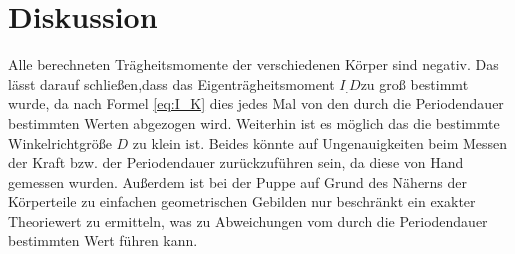 \section{Diskussion}
\label{sec:Diskussion}
Alle berechneten Trägheitsmomente der verschiedenen Körper sind negativ.
Das lässt darauf schließen,dass das Eigenträgheitsmoment $I_.D $zu groß bestimmt wurde, da nach Formel \eqref{eq:I_K} dies jedes Mal von den durch die Periodendauer bestimmten Werten abgezogen wird.\newline
Weiterhin ist es möglich das die bestimmte Winkelrichtgröße $D$ zu klein ist.
Beides könnte auf Ungenauigkeiten beim Messen der Kraft bzw. der Periodendauer zurückzuführen sein, da diese von Hand gemessen wurden.\newline
Außerdem ist bei der Puppe auf Grund des Näherns der Körperteile zu einfachen geometrischen Gebilden nur beschränkt ein exakter Theoriewert zu ermitteln, was zu Abweichungen vom durch die Periodendauer bestimmten Wert führen kann.